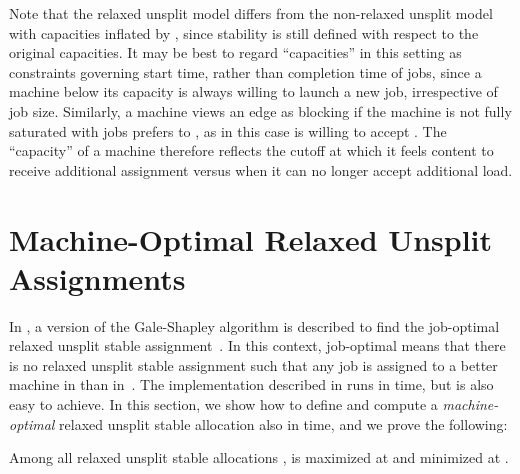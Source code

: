 \documentclass{llncs}
\begin{document}
Note that the relaxed unsplit model differs from the non-relaxed
unsplit model with capacities inflated by , since stability
is still defined with respect to the original capacities.  It may be
best to regard ``capacities'' in this setting as constraints governing
start time, rather than completion time of jobs, since a machine below
its capacity is always willing to launch a new job, irrespective of
job size.  Similarly, a machine  views an edge  as blocking if
the machine is not fully saturated with jobs  prefers to , as
in this case  is willing to accept .  The ``capacity'' of a
machine therefore reflects the cutoff at which it feels content to
receive additional assignment versus when it can no longer accept
additional load.

\section{Machine-Optimal Relaxed Unsplit Assignments}
\label{sec:jmopt}

In \cite{dean_unsplit}, a version of the Gale-Shapley algorithm is
described to find the job-optimal relaxed unsplit stable
assignment~.  In this context, job-optimal means that
there is no relaxed unsplit stable assignment  such that any job
is assigned to a better machine in  than in~.
The implementation described in \cite{dean_unsplit} runs in  time, but  is also easy to achieve.  In this
section, we show how to define and compute a \emph{machine-optimal}
relaxed unsplit stable allocation  also in 
time, and we prove the following:

\begin{theorem}
\label{thm:card}
Among all relaxed unsplit stable allocations ,  is maximized
at  and minimized at .
\end{theorem}
\end{document}
